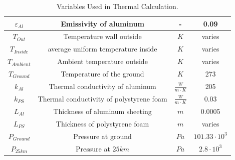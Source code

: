 \begin{table}[H]
{\begin{tabular}{|c|c|c|c|}
        $\varepsilon_{Al}$ & Emissivity of aluminum & - & 0.09 \\ \hline
        $T_{Out}$ & Temperature wall outside & $K$ & varies \\ \hline
        $T_{Inside}$ & average uniform temperature inside & $K$ & varies \\ \hline
        $T_{Ambient}$ & Ambient temperature outside & $K$ & varies \\ \hline
        $T_{Ground}$ & Temperature of the ground & $K$ & 273 \\ \hline
        $k_{Al}$ & Thermal conductivity of aluminum & $\frac{W}{m\cdot K}$ & 205 \\ \hline
        $k_{PS}$ & Thermal conductivity of polystyrene foam & $\frac{W}{m\cdot K}$ & 0.03 \\ \hline
        $L_{Al}$ & Thickness of aluminum sheeting & $m$ & 0.0005 \\ \hline
        $L_{PS}$ & Thickness of polystyrene foam & $m$ & varies \\ \hline
        $P_{Ground}$ & Pressure at ground & $Pa$ & $101.33 \cdot 10^3$ \\ \hline
        $P_{25km}$ & Pressure at $25 km$ & $Pa$ & $2.8 \cdot 10^3$ \\ \hline
    \end{tabular}}
    \caption{\color{blue}Variables Used in Thermal Calculation.}
    \label{tab:thermal-variables}
\end{table}

